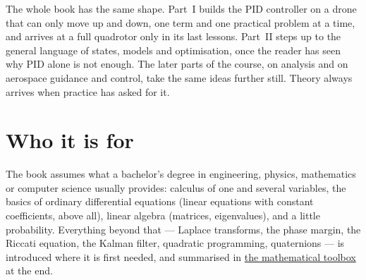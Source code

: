The whole book has the same shape. Part~I builds the PID controller on a drone that can only move up and down, one term and one practical problem at a time, and arrives at a full quadrotor only in its last lessons. Part~II steps up to the general language of states, models and optimisation, once the reader has seen why PID alone is not enough. The later parts of the course, on analysis and on aerospace guidance and control, take the same ideas further still. Theory always arrives when practice has asked for it.

\section*{Who it is for}
The book assumes what a bachelor's degree in engineering, physics, mathematics or computer science usually provides: calculus of one and several variables, the basics of ordinary differential equations (linear equations with constant coefficients, above all), linear algebra (matrices, eigenvalues), and a little probability. Everything beyond that — Laplace transforms, the phase margin, the Riccati equation, the Kalman filter, quadratic programming, quaternions — is introduced where it is first needed, and summarised in \hyperref[app:math]{the mathematical toolbox} at the end.

